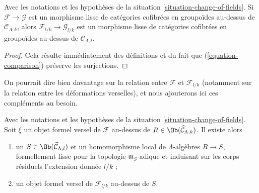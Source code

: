 \begin{lemma}
\label{lemma-change-of-fields-smooth}
Avec les notations et les hypothèses de la situation
\ref{situation-change-of-fields}. Si $\mathcal{F} \to \mathcal{G}$ est un
morphisme lisse de catégories cofibrées en groupoïdes au-dessus de
$\mathcal{C}_{\Lambda, k}$, alors
$\mathcal{F}_{l/k} \to \mathcal{G}_{l/k}$ est un morphisme lisse de catégories
cofibrées en groupoïdes au-dessus de $\mathcal{C}_{\Lambda, l}$.
\end{lemma}

\begin{proof}
Cela résulte immédiatement des définitions et du fait que
(\ref{equation-comparison}) préserve les surjections.
\end{proof}

\noindent
On pourrait dire bien davantage sur la relation entre $\mathcal{F}$ et
$\mathcal{F}_{l/k}$ (notamment sur la relation entre les déformations
verselles), et nous ajouterons ici ces compléments au besoin.

\begin{lemma}
\label{lemma-change-of-field-versal-ring}
Avec les notations et les hypothèses de la situation
\ref{situation-change-of-fields}. Soit $\xi$ un objet formel versel de
$\mathcal{F}$ au-dessus de
$R \in \Ob(\widehat{\mathcal{C}}_{\Lambda, k})$. Il existe alors
\begin{enumerate}
\item un $S \in \Ob(\widehat{\mathcal{C}}_{\Lambda, l})$ et un homomorphisme
local de $\Lambda$-algèbres $R \to S$, formellement lisse pour la topologie
$\mathfrak m_S$-adique et induisant sur les corps résiduels l'extension donnée
$l/k$ ;
\item un objet formel versel de $\mathcal{F}_{l/k}$ au-dessus de $S$.
\end{enumerate}
\end{lemma}

